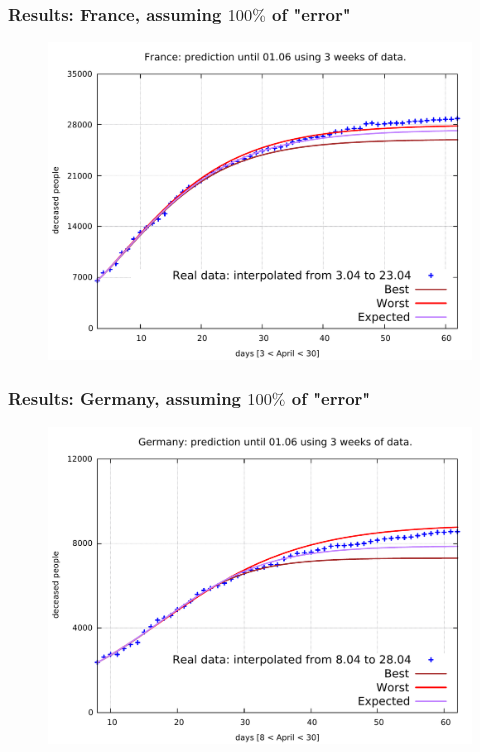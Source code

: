 \documentclass{beamer}
\begin{document}
\begin{frame}
	\frametitle{Results: France, assuming $100\%$ of "error"}
	\begin{figure}
\includegraphics[width=\linewidth]{../../err100p_simulations/fr/3-23/3-23.pdf}
	\end{figure}
\end{frame}

\begin{frame}
	\frametitle{Results: Germany, assuming $100\%$ of "error"}
	\begin{figure}
\includegraphics[width=\linewidth]{../../err100p_simulations/de/8-28/8-28.pdf}
	\end{figure}
\end{frame}
\end{document}

